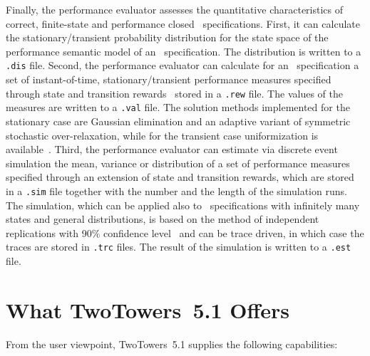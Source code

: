 Finally, the performance evaluator assesses the quantitative characteristics of correct, finite-state and
performance closed \aemilia\ specifications. First, it can calculate the stationary/transient probability
distribution for the state space of the performance semantic model of an \aemilia\ specification. The
distribution is written to a {\tt .dis} file. Second, the performance evaluator can calculate for an
\aemilia\ specification a set of instant-of-time, stationary/transient performance measures specified
through state and transition rewards~\cite{How} stored in a {\tt .rew} file. The values of the measures are
written to a {\tt .val} file. The solution methods implemented for the stationary case are Gaussian
elimination and an adaptive variant of symmetric stochastic over-relaxation, while for the transient case
uniformization is available~\cite{Ste1}. Third, the performance evaluator can estimate via discrete event
simulation the mean, variance or distribution of a set of performance measures specified through an
extension of state and transition rewards, which are stored in a {\tt .sim} file together with the number
and the length of the simulation runs. The simulation, which can be applied also to \aemilia\ specifications
with infinitely many states and general distributions, is based on the method of independent replications
with 90\% confidence level~\cite{Wel} and can be trace driven, in which case the traces are stored in
{\tt .trc} files. The result of the simulation is written to a {\tt .est} file.



\section{What TwoTowers~5.1 Offers}

From the user viewpoint, TwoTowers~5.1 supplies the following capabilities:

